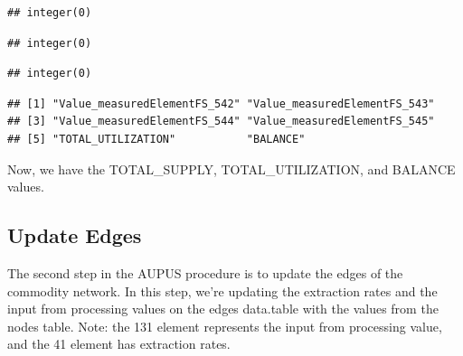 \documentclass[nojss]{jss}
\begin{document}
\begin{knitrout}
\color{fgcolor}\begin{kframe}
\begin{alltt}
\hlstd{(}   
\end{alltt}
\begin{verbatim}
## integer(0)
\end{verbatim}
\begin{alltt}
\hlstd{(}   
\end{alltt}
\begin{verbatim}
## integer(0)
\end{verbatim}
\begin{alltt}
\hlstd{(}   
\hlstd{(} \hlstd{=} \hlstd{,}  \hlstd{=} \hlstd{,}
                    
\end{alltt}
\begin{verbatim}
## integer(0)
\end{verbatim}
\begin{alltt}
\hlstd{(}
\end{alltt}
\begin{verbatim}
## [1] "Value_measuredElementFS_542" "Value_measuredElementFS_543"
## [3] "Value_measuredElementFS_544" "Value_measuredElementFS_545"
## [5] "TOTAL_UTILIZATION"           "BALANCE"
\end{verbatim}
\end{kframe}
\end{knitrout}

Now, we have the TOTAL\_SUPPLY, TOTAL\_UTILIZATION, and BALANCE values.

\subsection{Update Edges}

The second step in the AUPUS procedure is to update the edges of the commodity
network.  In this step, we're updating the extraction rates and the input from
processing values on the edges data.table with the values from the nodes
table.  Note: the 131 element represents the input from processing value, and
the 41 element has extraction rates.
\end{document}
